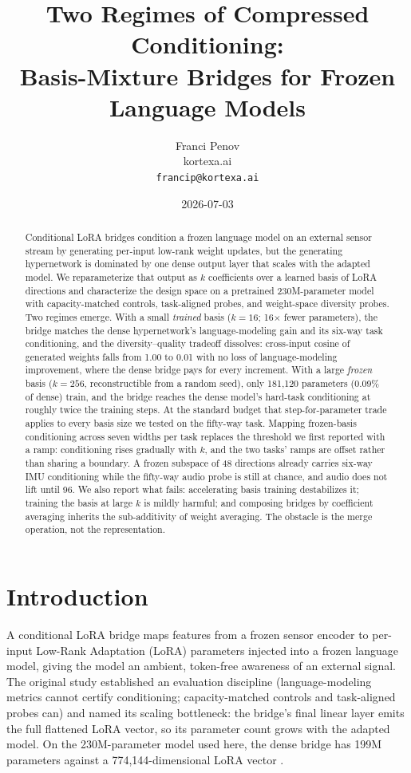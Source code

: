 \documentclass[11pt]{article}
\title{Two Regimes of Compressed Conditioning:\\Basis-Mixture Bridges for Frozen Language Models}
\author{Franci Penov \\ kortexa.ai \\ \texttt{francip@kortexa.ai}}
\date{2026-07-03}
\begin{document}
\maketitle

\begin{abstract}
Conditional LoRA bridges condition a frozen language model on an external sensor stream by generating per-input low-rank weight updates, but the generating hypernetwork is dominated by one dense output layer that scales with the adapted model. We reparameterize that output as $k$ coefficients over a learned basis of LoRA directions and characterize the design space on a pretrained 230M-parameter model with capacity-matched controls, task-aligned probes, and weight-space diversity probes. Two regimes emerge. With a small \emph{trained} basis ($k{=}16$; 16$\times$ fewer parameters), the bridge matches the dense hypernetwork's language-modeling gain and its six-way task conditioning, and the diversity--quality tradeoff dissolves: cross-input cosine of generated weights falls from 1.00 to 0.01 with no loss of language-modeling improvement, where the dense bridge pays for every increment. With a large \emph{frozen} basis ($k{=}256$, reconstructible from a random seed), only 181,120 parameters (0.09\% of dense) train, and the bridge reaches the dense model's hard-task conditioning at roughly twice the training steps. At the standard budget that step-for-parameter trade applies to every basis size we tested on the fifty-way task. Mapping frozen-basis conditioning across seven widths per task replaces the threshold we first reported with a ramp: conditioning rises gradually with $k$, and the two tasks' ramps are offset rather than sharing a boundary. A frozen subspace of 48 directions already carries six-way IMU conditioning while the fifty-way audio probe is still at chance, and audio does not lift until 96. We also report what fails: accelerating basis training destabilizes it; training the basis at large $k$ is mildly harmful; and composing bridges by coefficient averaging inherits the sub-additivity of weight averaging. The obstacle is the merge operation, not the representation.
\end{abstract}

\section{Introduction}
A conditional LoRA bridge \cite{penov2026bridges} maps features from a frozen sensor encoder to per-input Low-Rank Adaptation (LoRA) parameters injected into a frozen language model, giving the model an ambient, token-free awareness of an external signal. The original study established an evaluation discipline (language-modeling metrics cannot certify conditioning; capacity-matched controls and task-aligned probes can) and named its scaling bottleneck: the bridge's final linear layer emits the full flattened LoRA vector, so its parameter count grows with the adapted model. On the 230M-parameter model used here, the dense bridge has 199M parameters against a 774,144-dimensional LoRA vector \cite{penov2026note}.
\end{document}
